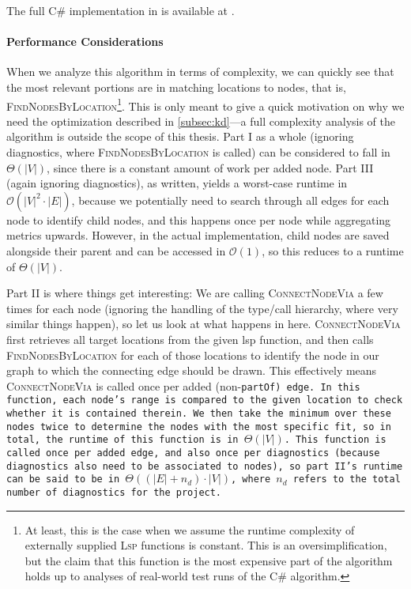 \documentclass[../thesis]{subfiles}
\begin{document}
The full C\# implementation in \SEE{} is available at .

\paragraph{Performance Considerations}\label{subsec:performance}
When we analyze this algorithm in terms of complexity, we can quickly see that the most relevant portions are in matching locations to nodes, that is, \textsc{FindNodesByLocation}\footnote{
	At least, this is the case when we assume the runtime complexity of externally supplied \textsc{Lsp} functions is constant.
	This is an oversimplification, but the claim that this function is the most expensive part of the algorithm holds up to analyses of real-world test runs of the C\# algorithm.
}.
This is only meant to give a quick motivation on why we need the optimization described in \cref{subsec:kd}---a full complexity analysis of the algorithm is outside the scope of this thesis.
Part I as a whole (ignoring diagnostics, where \textsc{FindNodesByLocation} is called) can be considered to fall in $\Theta(|V|)$, since there is a constant amount of work per added node.
Part III (again ignoring diagnostics), as written, yields a worst-case runtime in $\mathcal{O}(|V|^2 \cdot |E|)$, because we potentially need to search through all edges for each node to identify child nodes, and this happens once per node while aggregating metrics upwards.
However, in the actual implementation, child nodes are saved alongside their parent and can be accessed in $\mathcal{O}(1)$, so this reduces to a runtime of $\Theta(|V|)$.

Part II is where things get interesting:
We are calling \textsc{ConnectNodeVia} a few times for each node (ignoring the handling of the type/call hierarchy, where very similar things happen), so let us look at what happens in here.
\textsc{ConnectNodeVia} first retrieves all target locations from the given \gls{lsp} function, and then calls \textsc{FindNodesByLocation} for each of those locations to identify the node in our graph to which the connecting edge should be drawn.
This effectively means \textsc{ConnectNodeVia} is called once per added (non-\tt{partOf}) edge.
In this function, each node's range is compared to the given location to check whether it is contained therein.
We then take the minimum over these nodes twice to determine the nodes with the most specific fit, so in total, the runtime of this function is in $\Theta(|V|)$.
This function is called once per added edge, and also once per diagnostics (because diagnostics also need to be associated to nodes), so part II's runtime can be said to be in $\Theta((|E| + n_d) \cdot |V|)$, where $n_d$ refers to the total number of diagnostics for the project.
\end{document}

